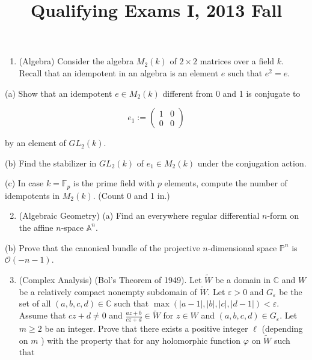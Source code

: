 \documentclass[10pt]{article}
\title{Qualifying Exams I, 2013 Fall }
\author{}
\date{}
\begin{document}
\maketitle
\begin{enumerate}
  \item (Algebra) Consider the algebra $M_{2}(k)$ of $2 \times 2$ matrices over a field $k$. Recall that an idempotent in an algebra is an element $e$ such that $e^{2}=e$.
\end{enumerate}

(a) Show that an idempotent $e \in M_{2}(k)$ different from 0 and 1 is conjugate to

$$
e_{1}:=\left(\begin{array}{ll}
1 & 0 \\
0 & 0
\end{array}\right)
$$

by an element of $G L_{2}(k)$.

(b) Find the stabilizer in $G L_{2}(k)$ of $e_{1} \in M_{2}(k)$ under the conjugation action.

(c) In case $k=\mathbb{F}_{p}$ is the prime field with $p$ elements, compute the number of idempotents in $M_{2}(k)$. (Count 0 and 1 in.)

\begin{enumerate}
  \setcounter{enumi}{1}
  \item (Algebraic Geometry) (a) Find an everywhere regular differential $n$-form on the affine $n$-space $\mathbb{A}^{n}$.
\end{enumerate}

(b) Prove that the canonical bundle of the projective $n$-dimensional space $\mathbb{P}^{n}$ is $\mathcal{O}(-n-1)$.

\begin{enumerate}
  \setcounter{enumi}{2}
  \item (Complex Analysis) (Bol's Theorem of 1949). Let $\tilde{W}$ be a domain in $\mathbb{C}$ and $W$ be a relatively compact nonempty subdomain of $\tilde{W}$. Let $\varepsilon>0$ and $G_{\varepsilon}$ be the set of all $(a, b, c, d) \in \mathbb{C}$ such that $\max (|a-1|,|b|,|c|,|d-1|)<\varepsilon$. Assume that $c z+d \neq 0$ and $\frac{a z+b}{c z+d} \in \tilde{W}$ for $z \in W$ and $(a, b, c, d) \in G_{\varepsilon}$. Let $m \geq 2$ be an integer. Prove that there exists a positive integer $\ell$ (depending on $m$ ) with the property that for any holomorphic function $\varphi$ on $\tilde{W}$ such that
\end{enumerate}
\end{document}
